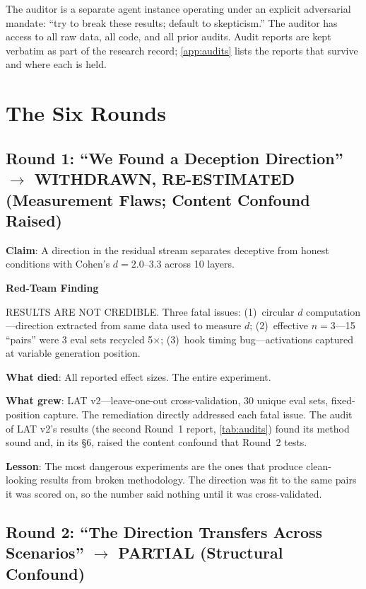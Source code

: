 \documentclass[11pt,letterpaper]{article}
\newenvironment{redteam}{%
  \colorlet{shadecolor}{redteambg}%
  \begin{shaded}%
  \noindent\textcolor{redteamred}{\textbf{Red-Team Finding}}\par\smallskip\noindent%
}{%
  \end{shaded}%
}
\begin{document}
The auditor is a separate agent instance operating under an explicit adversarial mandate: ``try to
break these results; default to skepticism.'' The auditor has access to all raw data, all code, and
all prior audits. Audit reports are kept verbatim as part of the research record; \cref{app:audits}
lists the reports that survive and where each is held.

\section{The Six Rounds}\label{sec:rounds}

\subsection{Round 1: ``We Found a Deception Direction'' $\to$ WITHDRAWN, RE-ESTIMATED (Measurement Flaws; Content Confound Raised)}

\textbf{Claim}: A direction in the residual stream separates deceptive from honest conditions with
Cohen's $d = 2.0$--$3.3$ across 10 layers.

\begin{redteam}
RESULTS ARE NOT CREDIBLE. Three fatal issues: (1)~circular $d$ computation---direction extracted
from same data used to measure $d$; (2)~effective $n=3$---15 ``pairs'' were 3 eval sets recycled
5$\times$; (3)~hook timing bug---activations captured at variable generation position.
\end{redteam}

\textbf{What died}: All reported effect sizes. The entire experiment.

\textbf{What grew}: LAT v2---leave-one-out cross-validation, 30 unique eval sets, fixed-position
capture. The remediation directly addressed each fatal issue. The audit of LAT v2's results
(the second Round~1 report, \cref{tab:audits}) found its method sound and, in its \S6, raised the
content confound that Round~2 tests.

\textbf{Lesson}: The most dangerous experiments are the ones that produce clean-looking results from
broken methodology. The direction was fit to the same pairs it was scored on, so the number said
nothing until it was cross-validated.

\subsection{Round 2: ``The Direction Transfers Across Scenarios'' $\to$ PARTIAL (Structural Confound)}
\end{document}
